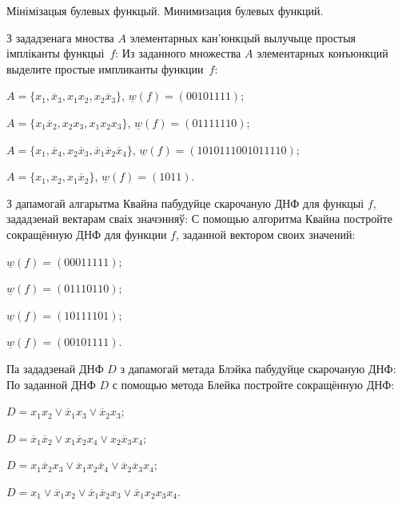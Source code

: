 \documentclass[12pt, a4paper]{article}
\begin{document}
\biLangHeader
{Мінімізацыя булевых функцый.}
{Минимизация булевых функций.}

\begin{problemList}

\problemItemWithCommonPart
{З зададзенага мноства $A$ элементарных кан'юнкцый вылучыце простыя імпліканты функцыі~$f$:}
{Из заданного множества $A$ элементарных конъюнкций выделите простые импликанты функции~$f$:}
{%
\begin{belarusianEnumerate}
    \item $A=\{x_1, \overline{x}_3, x_1x_2, x_2\overline{x}_3\}$, $\underline{w}(f)=(00101111)$;
    \item $A=\{x_1\overline{x}_2, x_2x_3, x_1x_2x_3\}$, $\underline{w}(f)=(01111110)$;
    \item $A=\{x_1, \overline{x}_4, x_2\overline{x}_3, \overline{x}_1\overline{x}_2\overline{x}_4\}$, $\underline{w}(f)=(1010111001011110)$;
    \item $A=\{x_1, x_2, x_1\overline{x}_2\}$, $\underline{w}(f)=(1011)$.
\end{belarusianEnumerate}
}

\smallskip

\problemItemWithCommonPart
{З дапамогай алгарытма Квайна пабудуйце скарочаную ДНФ для функцыі $f$,
зададзенай вектарам сваіх значэнняў:}
{С помощью алгоритма Квайна постройте сокращённую ДНФ для функции $f$, 
заданной вектором своих значений:}
{%
\begin{belarusianEnumerateTwocol}
    \item $\underline{w}(f)=(00011111)$;
    \item $\underline{w}(f)=(01110110)$;
    \item $\underline{w}(f)=(10111101)$;
    \item $\underline{w}(f)=(00101111)$.
\end{belarusianEnumerateTwocol}
}

\smallskip

\problemItemWithCommonPart
{Па зададзенай ДНФ $D$ з дапамогай метада Блэйка пабудуйце скарочаную ДНФ:}
{По заданной ДНФ $D$ с помощью метода Блейка постройте сокращённую ДНФ:}
{%
\begin{belarusianEnumerateTwocol}
    \item $D=x_1x_2\vee \overline{x}_1x_3\vee \overline{x}_2x_3$;
    \item $D=\overline{x}_1\overline{x}_2\vee x_1\overline{x}_2x_4\vee x_2\overline{x}_3x_4$;
    \item $D=x_1\overline{x}_2x_3\vee \overline{x}_1x_2\overline{x}_4\vee \overline{x}_2\overline{x}_3x_4$;
    \item $D=x_1\vee\overline{x}_1x_2\vee \overline{x}_1\overline{x}_2x_3\vee \overline{x}_1x_2x_3x_4$.
\end{belarusianEnumerateTwocol}
}


\end{problemList}
\end{document}
